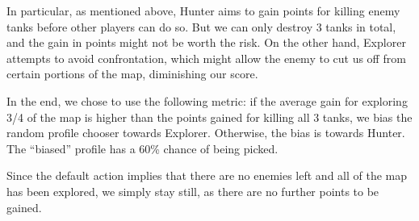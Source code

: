 \documentclass[11pt]{article}
\begin{document}
In particular, as mentioned above, Hunter aims to gain points for killing enemy tanks before other players can do so. But we can only destroy 3 tanks in total, and the gain in points might not be worth the risk. On the other hand, Explorer attempts to avoid confrontation, which might allow the enemy to cut us off from certain portions of the map, diminishing our score.

In the end, we chose to use the following metric: if the average gain for exploring 3/4 of the map is higher than the points gained for killing all 3 tanks, we bias the random profile chooser towards Explorer. Otherwise, the bias is towards Hunter. The ``biased'' profile has a 60\% chance of being picked.

Since the default action implies that there are no enemies left and all of the map has been explored, we simply stay still, as there are no further points to be gained.
\end{document}
